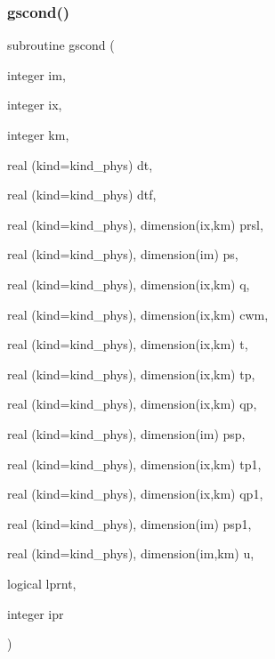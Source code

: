 \subsubsection{\texorpdfstring{gscond()}{gscond()}}
{\footnotesize\ttfamily subroutine gscond (\begin{DoxyParamCaption}\item[{integer}]{im,  }\item[{integer}]{ix,  }\item[{integer}]{km,  }\item[{real (kind=kind\+\_\+phys)}]{dt,  }\item[{real (kind=kind\+\_\+phys)}]{dtf,  }\item[{real (kind=kind\+\_\+phys), dimension(ix,km)}]{prsl,  }\item[{real (kind=kind\+\_\+phys), dimension(im)}]{ps,  }\item[{real (kind=kind\+\_\+phys), dimension(ix,km)}]{q,  }\item[{real (kind=kind\+\_\+phys), dimension(ix,km)}]{cwm,  }\item[{real (kind=kind\+\_\+phys), dimension(ix,km)}]{t,  }\item[{real (kind=kind\+\_\+phys), dimension(ix,km)}]{tp,  }\item[{real (kind=kind\+\_\+phys), dimension(ix,km)}]{qp,  }\item[{real (kind=kind\+\_\+phys), dimension(im)}]{psp,  }\item[{real (kind=kind\+\_\+phys), dimension(ix,km)}]{tp1,  }\item[{real (kind=kind\+\_\+phys), dimension(ix,km)}]{qp1,  }\item[{real (kind=kind\+\_\+phys), dimension(im)}]{psp1,  }\item[{real (kind=kind\+\_\+phys), dimension(im,km)}]{u,  }\item[{logical}]{lprnt,  }\item[{integer}]{ipr }\end{DoxyParamCaption})}


